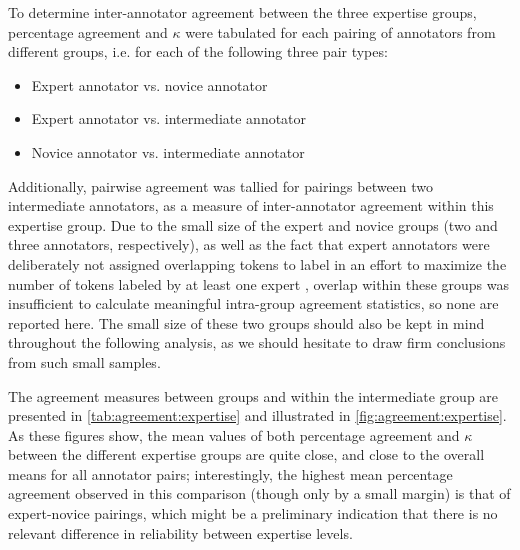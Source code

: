 	To determine inter-annotator agreement between the three expertise groups, percentage agreement and $\kappa$ were tabulated for each pairing of annotators from different groups, i.e. for each of the following three pair types:
	
	\begin{itemize}
	\item{Expert annotator vs. novice annotator}
	\item{Expert annotator vs. intermediate annotator}
	\item{Novice annotator vs. intermediate annotator}
	\end{itemize}
	
	Additionally, pairwise agreement was tallied for pairings between two intermediate annotators, as a measure of inter-annotator agreement within this expertise group. Due to the small size of the expert and novice groups (two and three annotators, respectively), as well as the fact that expert annotators were deliberately not assigned overlapping tokens to label in an effort to maximize the number of tokens labeled by at least one expert , overlap within these groups was insufficient to calculate meaningful intra-group agreement statistics, so none are reported here. The small size of these two groups should also be kept in mind throughout the following analysis, as we should hesitate to draw firm conclusions from such small samples. 
		
		The agreement measures between groups and within the intermediate group are presented in \cref{tab:agreement:expertise} and illustrated in \cref{fig:agreement:expertise}. As these figures show, the mean values of both percentage agreement and $\kappa$ between the different expertise groups are quite close, and close to the overall means for all annotator pairs;  interestingly, the highest mean percentage agreement observed in this comparison (though only by a small margin) is that of expert-novice pairings, which might be a preliminary indication that there is no relevant difference in reliability between expertise levels. 
			
		
		
